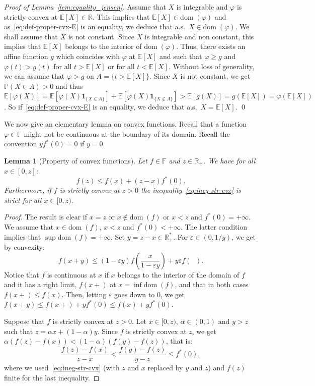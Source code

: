 \documentclass[12pt]{article}
\newcommand{\E}{{\mathbb E}}
\newcommand{\F}{{\mathbb F}}
\renewcommand{\P}{{\mathbb P}}
\newcommand{\R}{{\mathbb R}}
\newcommand{\dom}{{\mathrm{dom}}\;}
\newcommand{\inv}[1]{\mathop{\frac{1}{#1}}\nolimits}
\newcommand{\ind}{\mathbf{1}}
\theoremstyle{plain}
\newtheorem{lem}[theo]{Lemma}
\theoremstyle{remark}
\begin{document}
\begin{proof}[Proof of Lemma~\ref{lem:equality_jensen}]
Assume  that $X$  is  integrable  and $\varphi$  is  strictly convex  at
$\E[X]\in \R$.  This implies that
$\E[X]\in \dom (\varphi)$  and as~\eqref{eq:def-proper-cvx-E} is an
equality, we deduce that a.s.\ $X \in \dom  (\varphi)$.  We shall
assume  that $X$  is  not  constant. Since  $X$  is  integrable and  non
constant,  this  implies  that  $\E[X]$   belongs  to  the  interior  of
$\dom ( \varphi)$.   Thus,  there  exists an  affine  function  $g$  which
coincides with $\varphi$  at $\E[X]$ and such that $\varphi  \geq g$ and
$\varphi(t)>g(t)$ for all $t>\E[X]$ or  for all $t<\E[X]$.  Without loss
of  generality, we  can  assume that  $\varphi>g$  on $A=\{t>  \E[X]\}$.
Since   $X$  is   not  constant,   we  get   $\P(X\in  A)>0$   and  thus
$\E[\varphi(X)]=        \E[\varphi(X)\ind_{\{X\in         A\}}]        +
\E[\varphi(X)\ind_{\{X\not \in A\}}]> \E[g(X)]=g(\E[X])=\varphi(\E[X])$.
So if~\eqref{eq:def-proper-cvx-E}  is an equality, we  deduce that a.s.\
$X=\E[X]$. \hfill \qed
\end{proof}


We now give an
elementary lemma on convex functions. Recall that a function $\varphi\in
\F$ might not be continuous at the boundary of its domain.
Recall the convention $yf^*(0)=0$ if $y=0$.
\begin{lem}[Property of convex functions]
\label{lem:cvx-prop}
Let $f\in \F$ and $z\in \R_+$. We have for all $x\in [0,z]$:
\begin{equation}
   \label{eq:ineg-str-cvx}
   f(z) \leq   f(x) + (z-x) f^*(0).
\end{equation}
  Furthermore, if $f$ is strictly convex at $z>0$ the
  inequality~\eqref{eq:ineg-str-cvx} is strict for all $x\in [0, z)$.
\end{lem}
\begin{proof}
  The  result is  clear if  $x=z$ or  $x\not\in \dom  (f)$ or  $x<z$ and
  $f^*(0)=+\infty  $.   We  assume   that  $x\in  \dom(f)$,   $x<z$  and
  $f^*(0)<+\infty    $.    The    latter    condition    implies    that
  $\sup \dom(f)=+\infty  $.
  Set $y = z-x \in \R_+^*$.
  For  $\varepsilon\in (0,  1/y)$, we  get by
  convexity:
   \[
f(x+y) \leq  (1-\varepsilon y) f\left(\frac{x}{1- \varepsilon y}\right)
+ y \varepsilon f \left(\inv{\varepsilon}\right).
\]
Notice that  $f$ is continuous at $x$ if $x$ belongs to the interior of
the domain of $f$ and it has a right limit, $f(x+)$ at $x=
\inf \dom(f)$, and that in both cases $f(x+)\leq  f(x)$.
Then, letting $\varepsilon$ goes down to $0$, we get
$  f(x+y) \leq  f(x+) + yf^*(0)\leq  f(x) + y f^*(0)$.

Suppose that  $f$ is strictly convex at $z>0$. Let $x\in [0, z)$,
$\alpha\in (0, 1)$ and $y>z$ such that $z=\alpha x + (1-\alpha)
y$. Since $f$ is strictly convex at $z$, we get $\alpha(f(z)-f(x)) <
(1-\alpha) ( f(y) -f(z))$, that is:
\[
  \frac{f(z)- f(x)}{z-x} < \frac{f(y) - f(z)}{y-z}\leq  f^*(0),
\]
where we used~\eqref{eq:ineg-str-cvx} (with $z$ and $x$ replaced by $y$
and $z$) and $f(z)$ finite for the last inequality.
\end{proof}
\end{document}
